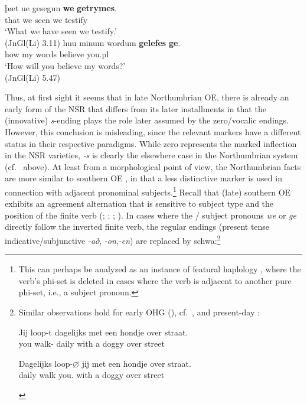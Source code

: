 \documentclass[output=paper]{langsci/langscibook}
\begin{document}
\ea
\ea
\label{exwege1}
\gll þæt ue gesegun \textbf{we} \textbf{getrymes}.\\
that we seen we testify\\
\glt`What we have seen we testify.'\\
(JnGl(Li) 3.11)
\ex
\gll huu minum wordum \textbf{gelefes} \textbf{ge}.\\
how my words believe you.pl\\
\glt `How will you believe my words?'\\
(JnGl(Li) 5.47)
\z
\z

Thus, at first sight it seems that in late Northumbrian \gls{OE}, there is
already an early form of the \gls{NSR} that differs from its later installments
in that the (innovative) \emph{s}-ending plays the role later assumed by the
zero/vocalic endings. However, this conclusion is misleading, since the
relevant markers have a different status in their respective paradigms. While
zero represents the marked inflection in the \gls{NSR} varieties, \emph{-s} is
clearly the elsewhere case in the Northumbrian  system (cf.\
 above). At least from a morphological point of view, the
Northumbrian facts are more similar to southern \gls{OE} ,
in that a less distinctive \isi{agreement} marker is used in connection with adjacent
pronominal subjects.\footnote{This can perhaps be analyzed as an instance of
    featural haplology \citep{Nevins:2012}, where the verb's phi-set is deleted
    in cases where the verb is adjacent to another pure phi-set, i.e., a
subject pronoun.}  Recall that (late) southern \gls{OE} exhibits an
agreement alternation that is sensitive to subject type and the position of
the finite verb (\citealt[15]{Jespersenpart4:1949};
\citealt[42]{QuirkWrenn:1955}; \citealt[296]{Campbell:1959};
\citealt{vanGelderen:2000}). In cases where the \Fpl/\Spl{} subject
pronouns \emph{we} or \emph{ge} directly follow the inverted finite verb,
the regular \isi{agreement} endings (present tense indicative/subjunctive
\emph{-að}, \emph{-on},\emph{-en}) are replaced by schwa:\footnote{Similar
    observations hold for early \gls{OHG} (\Fpl{}), cf.\
    \citet[262]{BrauneReiffenstein:2004}, and present-day 
    \citep[193]{AckNel:2004}:

    \begin{exe}
        \gll  Jij loop-t  dagelijks met een hondje over straat.\\
        you walk-\Ssg{} daily   with a  doggy over street\\
        \glt

        \gll Dagelijks loop-{$\varnothing$} jij  met een hondje over straat.\\
        daily   walk  you.\Pl{} with a  doggy over street\\
\end{exe}}
\end{document}

